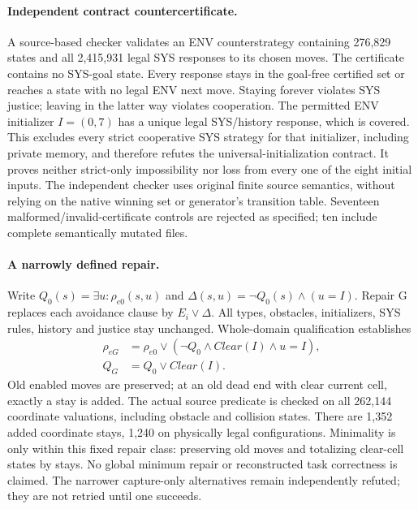 \paragraph{Independent contract countercertificate.}
A source-based checker validates an ENV counterstrategy containing
276,829 states and all 2,415,931 legal SYS responses to its chosen moves.
The certificate contains no SYS-goal state. Every response stays in the
goal-free certified set or reaches a state with no legal ENV next move.
Staying forever violates SYS justice; leaving in the latter way violates
cooperation. The permitted ENV initializer $I=(0,7)$ has a unique legal
SYS/history response, which is covered. This excludes every strict
cooperative SYS strategy for that initializer, including private memory,
and therefore refutes the universal-initialization contract. It proves
neither strict-only impossibility nor loss from every one of the eight
initial inputs. The independent checker uses original finite source
semantics, without relying on the native winning set or generator's
transition table. Seventeen malformed/invalid-certificate controls are
rejected as specified; ten include complete semantically mutated files.

\paragraph{A narrowly defined repair.}
Write $Q_0(s)=\exists u:\rho_{e0}(s,u)$ and
$\Delta(s,u)=\neg Q_0(s)\land(u=I)$. Repair G replaces each avoidance
clause by $E_i\lor\Delta$. All types, obstacles, initializers, SYS rules,
history and justice stay unchanged. Whole-domain qualification establishes
\[
\begin{aligned}
\rho_{eG}&=\rho_{e0}\lor(\neg Q_0\land Clear(I)\land u=I),\\
Q_G&=Q_0\lor Clear(I).
\end{aligned}
\]
Old enabled moves are preserved; at an old dead end with clear current
cell, exactly a stay is added. The actual source predicate is checked
on all 262,144 coordinate valuations, including obstacle and collision
states. There are 1,352 added coordinate stays, 1,240 on physically
legal configurations. Minimality is only within this fixed repair
class: preserving old moves and totalizing clear-cell states by stays.
No global minimum repair or reconstructed task correctness is claimed.
The narrower capture-only alternatives remain independently refuted;
they are not retried until one succeeds.

